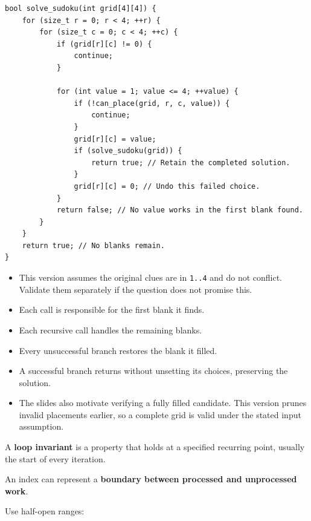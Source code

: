 \documentclass[11pt,a4paper]{article}
\providecommand{\tightlist}{\setlength{\itemsep}{0pt}\setlength{\parskip}{0pt}}
\begin{document}
\label{solving-with-backtracking}
\hypertarget{solving-with-backtracking}{}

\begin{lstlisting}[style=cscode]
bool solve_sudoku(int grid[4][4]) {
    for (size_t r = 0; r < 4; ++r) {
        for (size_t c = 0; c < 4; ++c) {
            if (grid[r][c] != 0) {
                continue;
            }

            for (int value = 1; value <= 4; ++value) {
                if (!can_place(grid, r, c, value)) {
                    continue;
                }
                grid[r][c] = value;
                if (solve_sudoku(grid)) {
                    return true; // Retain the completed solution.
                }
                grid[r][c] = 0; // Undo this failed choice.
            }
            return false; // No value works in the first blank found.
        }
    }
    return true; // No blanks remain.
}
\end{lstlisting}

\begin{itemize}
\tightlist
\item
  This version assumes the original clues are in \texttt{1..4} and do not conflict. Validate them separately if the question does not promise this.
\item
  Each call is responsible for the first blank it finds.
\item
  Each recursive call handles the remaining blanks.
\item
  Every unsuccessful branch restores the blank it filled.
\item
  A successful branch returns without unsetting its choices, preserving the solution.
\item
  The slides also motivate verifying a fully filled candidate. This version prunes invalid placements earlier, so a complete grid is valid under the stated input assumption.
\end{itemize}

\label{reasoning-about-loops-using-invariants}
\hypertarget{reasoning-about-loops-using-invariants}{}

A \textbf{loop invariant} is a property that holds at a specified recurring point, usually the start of every iteration.

An index can represent a \textbf{boundary between processed and unprocessed work}.

Use half-open ranges:
\end{document}
